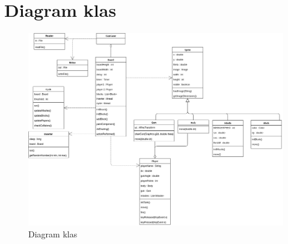 \documentclass[12pt]{report}
\begin{document}
\section{Diagram klas}
\begin{figure}[H]
    \centering
    \includegraphics[width=20cm, angle=90]{obrazy/Diagram.png}
    \caption{Diagram klas}
    \label{diagram klas}
    \end{figure}
\end{document}
